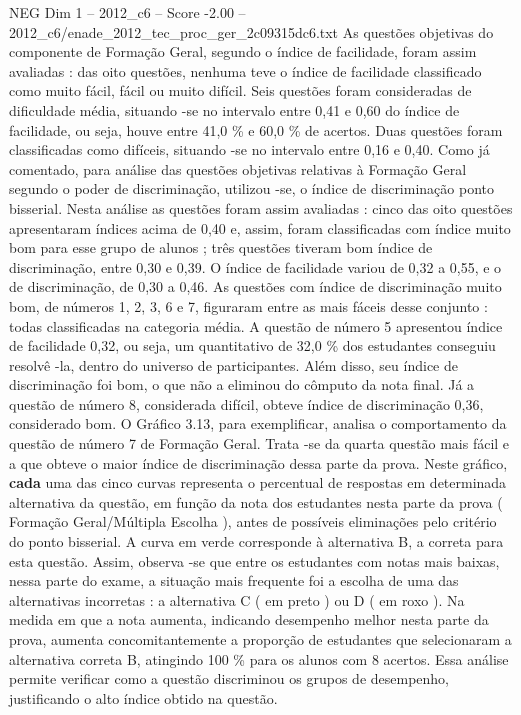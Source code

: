 \begin{textsample}{NEG Dim 1 – 2012\_c6 – Score -2.00 – 2012\_c6/enade\_2012\_tec\_proc\_ger\_2c09315dc6.txt}
As questões objetivas do componente de Formação Geral, segundo o índice de facilidade, foram assim avaliadas : das oito questões, nenhuma teve o índice de facilidade classificado como muito fácil, fácil ou muito difícil.
Seis questões foram consideradas de dificuldade média, situando -se no intervalo entre 0,41 e 0,60 do índice de facilidade, ou seja, houve entre 41,0 \% e 60,0 \% de acertos.
Duas questões foram classificadas como difíceis, situando -se no intervalo entre 0,16 e 0,40.
Como já comentado, para análise das questões objetivas relativas à Formação Geral segundo o poder de discriminação, utilizou -se, o índice de discriminação ponto bisserial.
Nesta análise as questões foram assim avaliadas : cinco das oito questões apresentaram índices acima de 0,40 e, assim, foram classificadas com índice muito bom para esse grupo de alunos ; três questões tiveram bom índice de discriminação, entre 0,30 e 0,39.
O índice de facilidade variou de 0,32 a 0,55, e o de discriminação, de 0,30 a 0,46.
As questões com índice de discriminação muito bom, de números 1, 2, 3, 6 e 7, figuraram entre as mais fáceis desse conjunto : todas classificadas na categoria média.
A questão de número 5 apresentou índice de facilidade 0,32, ou seja, um quantitativo de 32,0 \% dos estudantes conseguiu resolvê -la, dentro do universo de participantes.
Além disso, seu índice de discriminação foi bom, o que não a eliminou do cômputo da nota final.
Já a questão de número 8, considerada difícil, obteve índice de discriminação 0,36, considerado bom.
O Gráfico 3.13, para exemplificar, analisa o comportamento da questão de número 7 de Formação Geral.
Trata -se da quarta questão mais fácil e a que obteve o maior índice de discriminação dessa parte da prova.
Neste gráfico, \textbf{cada} uma das cinco curvas representa o percentual de respostas em determinada alternativa da questão, em função da nota dos estudantes nesta parte da prova ( Formação Geral/Múltipla Escolha ), antes de possíveis eliminações pelo critério do ponto bisserial.
A curva em verde corresponde à alternativa B, a correta para esta questão.
Assim, observa -se que entre os estudantes com notas mais baixas, nessa parte do exame, a situação mais frequente foi a escolha de uma das alternativas incorretas : a alternativa C ( em preto ) ou D ( em roxo ).
Na medida em que a nota aumenta, indicando desempenho melhor nesta parte da prova, aumenta concomitantemente a proporção de estudantes que selecionaram a alternativa correta B, atingindo 100 \% para os alunos com 8 acertos.
Essa análise permite verificar como a questão discriminou os grupos de desempenho, justificando o alto índice obtido na questão.

\end{textsample}
